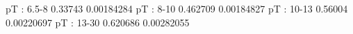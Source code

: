 pT : 6.5-8
0.33743 0.00184284
pT : 8-10
0.462709 0.00184827
pT : 10-13
0.56004 0.00220697
pT : 13-30
0.620686 0.00282055
